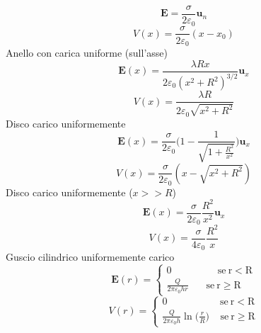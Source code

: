 \documentclass{book}
\newcommand{\h}{\mathbf}
\newcommand{\e}{\begin{equation}}
\newcommand{\ex}{\end{equation} }
\begin{document}
\begin{multicols}{4}
\begin{itemize}
        \e{\h{E}=\frac{\sigma}{2\varepsilon_0} \h{u}_n } \ex
        \e{V(x)=\frac{\sigma}{2\varepsilon_0}(x-x_0)} \ex   
    Anello con carica uniforme (sull’asse)
        \e{\h{E}(x)=\frac{\lambda R x}{2\varepsilon_0(x^2+R^2)^{3/2}} \h{u}_x} \ex
        \e{V(x)=\frac{\lambda R}{2\varepsilon_0\sqrt{x^2+R^2}}} \ex
    Disco carico uniformemente
        \e{\h{E}(x)=\frac{\sigma}{2\varepsilon_0}\biggl( 1-\frac{1}{\sqrt{1+\frac{R^2}{x^2}}} \biggr)\h{u}_x}\ex
        \e{V(x)=\frac{\sigma}{2\varepsilon_0}(x-\sqrt{x^2+R^2})}\ex
    Disco carico uniformemente ($x>>R$)
        \e{\h{E}(x)=\frac{\sigma}{2\varepsilon_0}\frac{R^2}{x^2}\h{u}_x}\ex
        \e{V(x)=\frac{\sigma}{4\varepsilon_0}\frac{R^2}{x}} \ex
    Guscio cilindrico uniformemente carico
        \e{ \h{E}(r)=\begin{cases} 
        0 \qquad \qquad \ \ \mathrm{\ se\ r<R}\\
        \frac{Q}{2\pi\varepsilon_0 h r} \ \ \ \ \ \ \ \mathrm{\ se\ r\geq R}\end{cases} } \ex
        \e{ V(r)=\begin{cases} 
        0 \qquad \qquad \ \ \ \ \ \mathrm{\ se\ r<R}\\
        \frac{Q}{2\pi\varepsilon_0 h} \ln\bigl(\frac{r}{R}\bigr)  \ \ \ \ \mathrm{\ se\ r\geq R}\end{cases} } \ex
    

\end{itemize}
\end{multicols}
\end{document}
